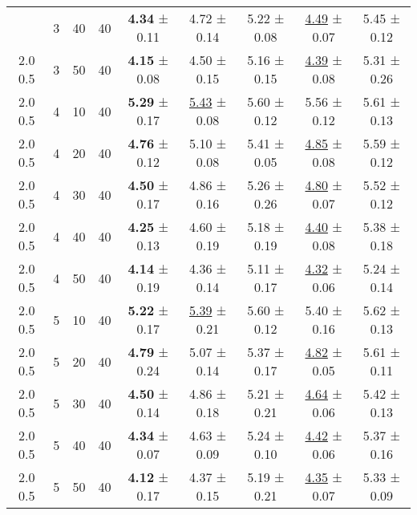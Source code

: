 \begin{tabular}{ccccccccc}
\begin{tabular}{lllllllll}
2.0 0.5 & 3 & 40 & 40 & \textbf{4.34} ± 0.11 &             4.72 ± 0.14 & 5.22 ± 0.08 & \underline{4.49} ± 0.07 & 5.45 ± 0.12 \\
2.0 0.5 & 3 & 50 & 40 & \textbf{4.15} ± 0.08 &             4.50 ± 0.15 & 5.16 ± 0.15 & \underline{4.39} ± 0.08 & 5.31 ± 0.26 \\
2.0 0.5 & 4 & 10 & 40 & \textbf{5.29} ± 0.17 & \underline{5.43} ± 0.08 & 5.60 ± 0.12 &             5.56 ± 0.12 & 5.61 ± 0.13 \\
2.0 0.5 & 4 & 20 & 40 & \textbf{4.76} ± 0.12 &             5.10 ± 0.08 & 5.41 ± 0.05 & \underline{4.85} ± 0.08 & 5.59 ± 0.12 \\
2.0 0.5 & 4 & 30 & 40 & \textbf{4.50} ± 0.17 &             4.86 ± 0.16 & 5.26 ± 0.26 & \underline{4.80} ± 0.07 & 5.52 ± 0.12 \\
2.0 0.5 & 4 & 40 & 40 & \textbf{4.25} ± 0.13 &             4.60 ± 0.19 & 5.18 ± 0.19 & \underline{4.40} ± 0.08 & 5.38 ± 0.18 \\
2.0 0.5 & 4 & 50 & 40 & \textbf{4.14} ± 0.19 &             4.36 ± 0.14 & 5.11 ± 0.17 & \underline{4.32} ± 0.06 & 5.24 ± 0.14 \\
2.0 0.5 & 5 & 10 & 40 & \textbf{5.22} ± 0.17 & \underline{5.39} ± 0.21 & 5.60 ± 0.12 &             5.40 ± 0.16 & 5.62 ± 0.13 \\
2.0 0.5 & 5 & 20 & 40 & \textbf{4.79} ± 0.24 &             5.07 ± 0.14 & 5.37 ± 0.17 & \underline{4.82} ± 0.05 & 5.61 ± 0.11 \\
2.0 0.5 & 5 & 30 & 40 & \textbf{4.50} ± 0.14 &             4.86 ± 0.18 & 5.21 ± 0.21 & \underline{4.64} ± 0.06 & 5.42 ± 0.13 \\
2.0 0.5 & 5 & 40 & 40 & \textbf{4.34} ± 0.07 &             4.63 ± 0.09 & 5.24 ± 0.10 & \underline{4.42} ± 0.06 & 5.37 ± 0.16 \\
2.0 0.5 & 5 & 50 & 40 & \textbf{4.12} ± 0.17 &             4.37 ± 0.15 & 5.19 ± 0.21 & \underline{4.35} ± 0.07 & 5.33 ± 0.09 \\
\bottomrule
\end{tabular}
